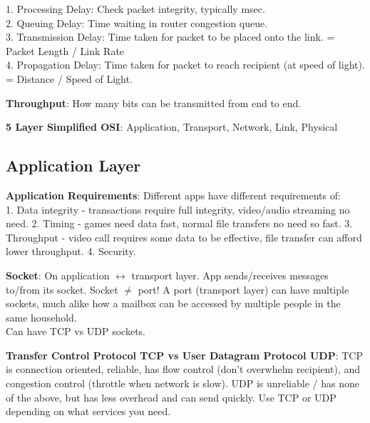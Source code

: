 \documentclass[a4paper,landscape]{article}
\newcommand{\rntopic}[1]{\vspace{-2.0em}\subsection*{#1}\vspace{-1.0em}}
\newcommand{\rnname}[1]{\textbf{#1}}
\begin{document}
\begin{multicols*}{4}
\begin{flatitemize}
1. Processing Delay: Check packet integrity, typically msec.\\
2. Queuing Delay: Time waiting in router congestion queue.\\
3. Transmission Delay: Time taken for packet to be placed onto the link. = Packet Length / Link Rate\\
4. Propagation Delay: Time taken for packet to reach recipient (at speed of light). = Distance / Speed of Light.
\item \rnname{Throughput}: How many bits can be transmitted from end to end.
\item \rnname{5 Layer Simplified OSI}: Application, Transport, Network, Link, Physical

\end{flatitemize}
\rntopic{Application Layer}
\vspace{0.3cm}
\begin{flatitemize}
\item \rnname{Application Requirements}: Different apps have different requirements of:\\
1. Data integrity - transactions require full integrity, video/audio streaming no need.
2. Timing - games need data fast, normal file transfers no need so fast.
3. Throughput - video call requires some data to be effective, file transfer can afford lower throughput.
4. Security.
\item \rnname{Socket}: On application $\leftrightarrow$ transport layer. App sends/receives messages to/from its socket. Socket $\neq$ port! A port (transport layer) can have multiple sockets, much alike how a mailbox can be accessed by multiple people in the same household.\\
Can have TCP vs UDP sockets.

\item \rnname{Transfer Control Protocol TCP vs User Datagram Protocol UDP}: TCP is connection oriented, reliable, has flow control (don't overwhelm recipient), and congestion control (throttle when network is slow). UDP is unreliable / has none of the above, but has less overhead and can send quickly. Use TCP or UDP depending on what services you need.


\end{flatitemize}
\end{multicols*}
\end{document}
